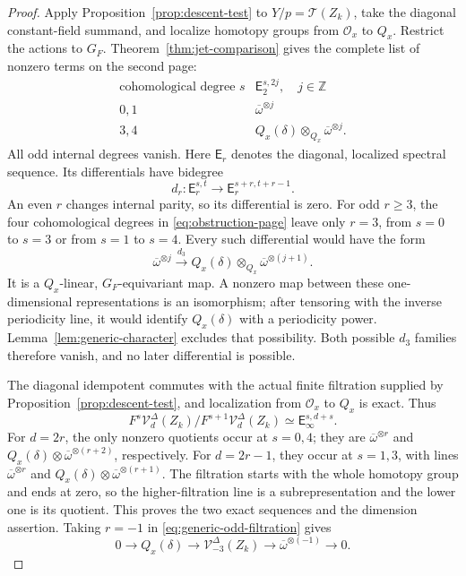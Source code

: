 \begin{proof}

Apply Proposition~\ref{prop:descent-test} to
\(Y/p=\mathcal T(Z_k)\), take the diagonal constant-field summand, and
localize homotopy groups from \(\mathcal O_x\) to \(Q_x\). Restrict the
actions to \(G_F\). Theorem~\ref{thm:jet-comparison} gives the complete list
of nonzero terms on the second page:
\begin{equation}\label{eq:obstruction-page}
\begin{array}{c|c}
 \text{cohomological degree }s & \mathsf E_2^{s,2j},\quad j\in\mathbb Z
 \\\hline
 0,1 & \overline\omega^{\otimes j}\\[2pt]
 3,4 & Q_x(\delta)\otimes_{Q_x}\overline\omega^{\otimes j}.
\end{array}
\end{equation}
All odd internal degrees vanish. Here \(\mathsf E_r\) denotes the diagonal,
localized spectral sequence. Its differentials have bidegree
\[
 d_r:\mathsf E_r^{s,t}\longrightarrow\mathsf E_r^{s+r,t+r-1}.
\]
An even \(r\) changes internal parity, so its differential is zero. For odd
\(r\geq3\), the four cohomological degrees in \eqref{eq:obstruction-page}
leave only \(r=3\), from \(s=0\) to \(s=3\) or from \(s=1\) to \(s=4\).
Every such differential would have the form
\begin{equation}\label{eq:forbidden-differential}
 \overline\omega^{\otimes j}\xrightarrow{\ d_3\ }
       Q_x(\delta)\otimes_{Q_x}\overline\omega^{\otimes(j+1)}.
\end{equation}
It is a \(Q_x\)-linear, \(G_F\)-equivariant map. A nonzero map between these
one-dimensional representations is an isomorphism; after tensoring with
the inverse periodicity line, it would identify \(Q_x(\delta)\) with a
periodicity power. Lemma~\ref{lem:generic-character} excludes that
possibility. Both possible \(d_3\) families therefore vanish, and no later
differential is possible.

The diagonal idempotent commutes with the actual finite filtration
supplied by Proposition~\ref{prop:descent-test}, and localization from
\(\mathcal O_x\) to \(Q_x\) is exact. Thus
\[
 F^s\mathcal V_d^\Delta(Z_k)/F^{s+1}\mathcal V_d^\Delta(Z_k)
       \simeq\mathsf E_\infty^{s,d+s}.
\]
For \(d=2r\), the only nonzero quotients occur at \(s=0,4\);
they are \(\overline\omega^{\otimes r}\) and
\(Q_x(\delta)\otimes\overline\omega^{\otimes(r+2)}\), respectively.
For \(d=2r-1\), they occur at \(s=1,3\), with lines
\(\overline\omega^{\otimes r}\) and
\(Q_x(\delta)\otimes\overline\omega^{\otimes(r+1)}\).
The filtration starts with the whole homotopy group and ends at zero,
so the higher-filtration line is a subrepresentation and the lower one
is its quotient. This proves the two exact sequences and the dimension
assertion. Taking \(r=-1\) in \eqref{eq:generic-odd-filtration} gives
\[
 0\longrightarrow Q_x(\delta)
 \longrightarrow\mathcal V_{-3}^\Delta(Z_k)
 \longrightarrow\overline\omega^{\otimes(-1)}\longrightarrow0.
\]
\end{proof}

